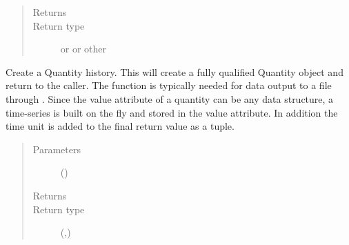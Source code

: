 \documentclass[letterpaper,10pt,openany,oneside,english]{sphinxmanual}
\begin{document}
\begin{fulllineitems}
\begin{fulllineitems}
\begin{quote}
\begin{description}
\begin{itemize}
\end{itemize}

\item[{Returns}] \leavevmode
{}

\item[{Return type}] \leavevmode
{} or  or other

\end{description}\end{quote}

\end{fulllineitems}


\begin{fulllineitems}
\label{\detokenize{support_rst/phase:phase.Phase.get_quantity_history}}
Create a Quantity  history. This will create a fully qualified
Quantity object and return to the caller. The function is typically
needed for data output to a file through . Since the value
attribute of a quantity can be any data structure, a time-series is
built on the fly and stored in the value attribute. In addition the
time unit is added to the final return value as a tuple.
\begin{quote}\begin{description}
\item[{Parameters}] \leavevmode
{} () \textendash{} 

\item[{Returns}] \leavevmode
{}

\item[{Return type}] \leavevmode
{}({\hyperref[\detokenize{support_rst/quantity:quantity.Quantity}]{}},)

\end{description}\end{quote}

\end{fulllineitems}


\end{fulllineitems}
\end{document}
